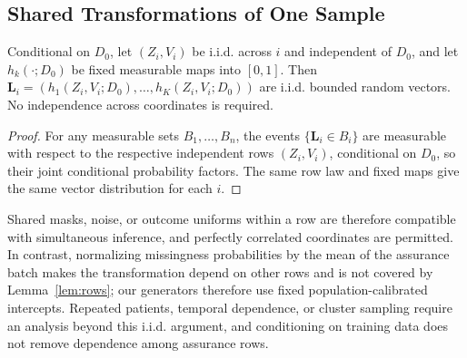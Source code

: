 \documentclass[twoside,11pt]{article}
\begin{document}
\subsection{Shared Transformations of One Sample}
\begin{lemma}
\label{lem:rows}
Conditional on $D_0$, let $(Z_i,V_i)$ be i.i.d. across $i$ and independent of $D_0$, and let
$h_k(\cdot;D_0)$ be fixed measurable maps into $[0,1]$. Then
$\mathbf L_i=(h_1(Z_i,V_i;D_0),\ldots,h_K(Z_i,V_i;D_0))$ are i.i.d. bounded random vectors.
No independence across coordinates is required.
\end{lemma}
\begin{proof}
For any measurable sets $B_1,\ldots,B_n$, the events $\{\mathbf L_i\in B_i\}$ are measurable
with respect to the respective independent rows $(Z_i,V_i)$, conditional on $D_0$, so their
joint conditional probability factors. The same row law and fixed maps give the same vector
distribution for each $i$.
\end{proof}

Shared masks, noise, or outcome uniforms within a row are therefore compatible with
simultaneous inference, and perfectly correlated coordinates are permitted. In contrast,
normalizing missingness probabilities by the mean of the assurance batch makes the
transformation depend on other rows and is not covered by Lemma~\ref{lem:rows}; our
generators therefore use fixed population-calibrated intercepts. Repeated patients, temporal
dependence, or cluster sampling require an analysis beyond this i.i.d. argument, and
conditioning on training data does not remove dependence among assurance rows.
\end{document}
